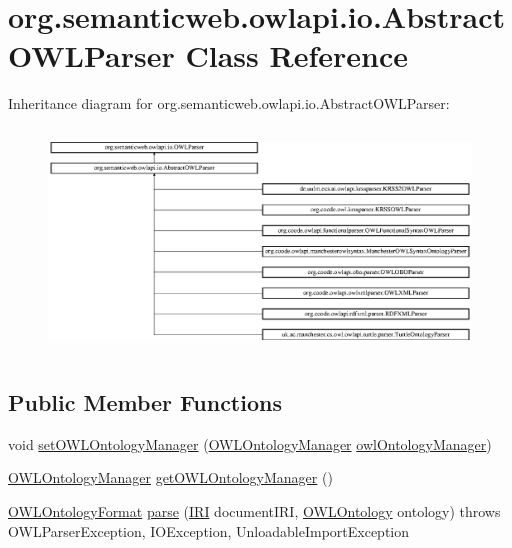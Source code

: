 \hypertarget{classorg_1_1semanticweb_1_1owlapi_1_1io_1_1_abstract_o_w_l_parser}{\section{org.\-semanticweb.\-owlapi.\-io.\-Abstract\-O\-W\-L\-Parser Class Reference}
\label{classorg_1_1semanticweb_1_1owlapi_1_1io_1_1_abstract_o_w_l_parser}
}
Inheritance diagram for org.\-semanticweb.\-owlapi.\-io.\-Abstract\-O\-W\-L\-Parser\-:\begin{figure}[H]
\begin{center}
\leavevmode
\includegraphics[height=5.982906cm]{classorg_1_1semanticweb_1_1owlapi_1_1io_1_1_abstract_o_w_l_parser}
\end{center}
\end{figure}
\subsection*{Public Member Functions}
\begin{DoxyCompactItemize}
\item 
void \hyperlink{classorg_1_1semanticweb_1_1owlapi_1_1io_1_1_abstract_o_w_l_parser_a6a9b93b9445bab9b0323224d480dfcb0}{set\-O\-W\-L\-Ontology\-Manager} (\hyperlink{interfaceorg_1_1semanticweb_1_1owlapi_1_1model_1_1_o_w_l_ontology_manager}{O\-W\-L\-Ontology\-Manager} \hyperlink{classorg_1_1semanticweb_1_1owlapi_1_1io_1_1_abstract_o_w_l_parser_a6c362e88fff9fb36e661995812843370}{owl\-Ontology\-Manager})
\item 
\hyperlink{interfaceorg_1_1semanticweb_1_1owlapi_1_1model_1_1_o_w_l_ontology_manager}{O\-W\-L\-Ontology\-Manager} \hyperlink{classorg_1_1semanticweb_1_1owlapi_1_1io_1_1_abstract_o_w_l_parser_a0a4fbe6edb85000773d271f0337b7a77}{get\-O\-W\-L\-Ontology\-Manager} ()
\item 
\hyperlink{classorg_1_1semanticweb_1_1owlapi_1_1model_1_1_o_w_l_ontology_format}{O\-W\-L\-Ontology\-Format} \hyperlink{classorg_1_1semanticweb_1_1owlapi_1_1io_1_1_abstract_o_w_l_parser_a495633a0b5d6bd211b05254362f1ea93}{parse} (\hyperlink{classorg_1_1semanticweb_1_1owlapi_1_1model_1_1_i_r_i}{I\-R\-I} document\-I\-R\-I, \hyperlink{interfaceorg_1_1semanticweb_1_1owlapi_1_1model_1_1_o_w_l_ontology}{O\-W\-L\-Ontology} ontology)  throws O\-W\-L\-Parser\-Exception, I\-O\-Exception, Unloadable\-Import\-Exception 
\end{DoxyCompactItemize}
